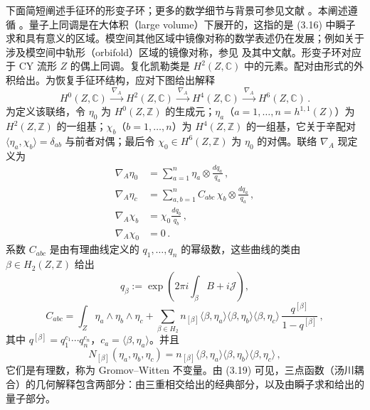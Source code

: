 下面简短阐述手征环的形变子环；更多的数学细节与背景可参见文献 \cite{ref45,ref8}。本阐述遵循 \cite{ref46}。量子上同调是在大体积（large volume）下展开的，这指的是 (3.16) 中瞬子求和具有意义的区域。模空间其他区域中镜像对称的数学表述仍在发展；例如关于涉及模空间中轨形（orbifold）区域的镜像对称，参见 \cite{ref47} 及其中文献。形变子环对应于 CY 流形 $Z$ 的偶上同调。复化凯勒类是 $H^2(Z,\mathbb{C})$ 中的元素。配对由形式的外积给出。为恢复手征环结构，应对下图给出解释
\begin{equation}\tag{3.17}
H^{0}(Z,\mathbb{C})\xrightarrow{\ \nabla_A\ }H^{2}(Z,\mathbb{C})
\xrightarrow{\ \nabla_A\ }H^{4}(Z,\mathbb{C})
\xrightarrow{\ \nabla_A\ }H^{6}(Z,\mathbb{C})\,.
\end{equation}
为定义该联络，令 $\eta_0$ 为 $H^0(Z,\mathbb{Z})$ 的生成元；$\eta_a$（$a=1,\ldots,n=h^{1,1}(Z)$）为 $H^2(Z,\mathbb{Z})$ 的一组基；$\chi_b$（$b=1,\ldots,n$）为 $H^4(Z,\mathbb{Z})$ 的一组基，它关于辛配对 $\langle\eta_a,\chi_b\rangle=\delta_{ab}$ 与前者对偶；最后令 $\chi_0\in H^6(Z,\mathbb{Z})$ 为 $\eta_0$ 的对偶。联络 $\nabla_A$ 现定义为
\begin{equation}\tag{3.18}
\begin{aligned}
\nabla_A\eta_0&=\sum_{a=1}^{n}\eta_a\otimes\frac{dq_a}{q_a}\,,\\
\nabla_A\eta_c&=\sum_{a,b=1}^{n}C_{abc}\,\chi_b\otimes\frac{dq_a}{q_a}\,,\\
\nabla_A\chi_b&=\chi_0\frac{dq_b}{q_b}\,,\\
\nabla_A\chi_0&=0\,.
\end{aligned}
\end{equation}
系数 $C_{abc}$ 是由有理曲线定义的 $q_1,\ldots,q_n$ 的幂级数，这些曲线的类由 $\beta\in H_2(Z,\mathbb{Z})$ 给出
\[
q_{\beta}:=\exp\left(2\pi i\int_{\beta}B+i\mathcal{J}\right),
\]
\begin{equation}\tag{3.19}
C_{abc}=\int_{Z}\eta_a\wedge\eta_b\wedge\eta_c
+\sum_{\beta\in H_2}n_{[\beta]}\langle\beta,\eta_a\rangle\langle\beta,\eta_b\rangle\langle\beta,\eta_c\rangle\,
\frac{q^{[\beta]}}{1-q^{[\beta]}}\,,
\end{equation}
其中 $q^{[\beta]}=q_1^{c_1}\cdots q_n^{c_n}$，$c_a=\langle\beta,\eta_a\rangle$。并且
\begin{equation}\tag{3.20}
N_{[\beta]}(\eta_a,\eta_b,\eta_c)=n_{[\beta]}\langle\beta,\eta_a\rangle\langle\beta,\eta_b\rangle\langle\beta,\eta_c\rangle\,,
\end{equation}
它们是有理数，称为 Gromov--Witten 不变量。由 (3.19) 可见，三点函数（汤川耦合）的几何解释包含两部分：由三重相交给出的经典部分，以及由瞬子求和给出的量子部分。
